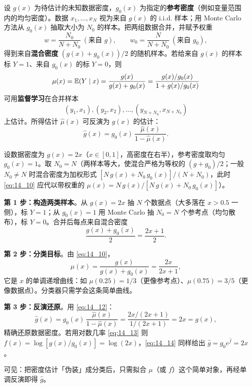 \begin{definition}[密度估计转分类]
设 $g(x)$ 为待估计的未知数据密度，$g_0(x)$ 为指定的\textbf{参考密度}（例如变量范围内的均匀密度）。数据 $x_1,\dots,x_N$ 视为来自 $g(x)$ 的 i.i.d. 样本；用 Monte Carlo 方法从 $g_0(x)$ 抽取大小为 $N_0$ 的样本。把两组数据合并，并赋予权重
\[
w = \frac{N_0}{N+N_0}\ (\text{来自 } g),\qquad w_0 = \frac{N}{N+N_0}\ (\text{来自 } g_0),
\]
得到来自\textbf{混合密度} $(g(x)+g_0(x))/2$ 的随机样本。若给来自 $g(x)$ 的样本标 $Y=1$、来自 $g_0(x)$ 的标 $Y=0$，则
\begin{equation}
\mu(x) = \mathbb{E}(Y\mid x) = \frac{g(x)}{g(x)+g_0(x)} = \frac{g(x)/g_0(x)}{1+g(x)/g_0(x)} \label{eq:14_10}
\end{equation}
可用\textbf{监督学习}在合并样本
\begin{equation}
(y_1,x_1), (y_2,x_2), \dots, (y_{N+N_0}, x_{N+N_0}) \label{eq:14_11}
\end{equation}
上估计。所得估计 $\hat\mu(x)$ 可反演为 $g(x)$ 的估计：
\begin{equation}
\hat g(x) = g_0(x)\,\frac{\hat\mu(x)}{1-\hat\mu(x)}. \label{eq:14_12}
\end{equation}
\end{definition}

\begin{example}[一维密度估计转分类的完整流程]
设数据密度为 $g(x)=2x$（$x\in[0,1]$，高密度在右半），参考密度取均匀 $g_0(x)=1$。取 $N_0=N$（两样本等大，使混合严格为等权的 $(g+g_0)/2$；一般 $N_0\neq N$ 时混合密度为加权形式 $[N\,g(x)+N_0\,g_0(x)]/(N+N_0)$，此时 \eqref{eq:14_10} 应代以带权重的 $\mu(x)=N\,g(x)/[N\,g(x)+N_0\,g_0(x)]$）。

\textbf{第 1 步：构造两类样本}。从 $g(x)=2x$ 抽 $N$ 个数据点（大多落在 $x>0.5$ 一侧），标 $Y=1$；从 $g_0(x)=1$ 用 Monte Carlo 抽 $N_0=N$ 个参考点（均匀散布），标 $Y=0$。合并后每点来自混合密度
\[
\frac{g(x)+g_0(x)}{2}=\frac{2x+1}{2}.
\]

\textbf{第 2 步：分类目标}。由 \eqref{eq:14_10}，
\[
\mu(x)=\frac{g(x)}{g(x)+g_0(x)}=\frac{2x}{2x+1},
\]
它是 $x$ 的单调递增曲线：如 $\mu(0.25)=1/3$（更像参考点）、$\mu(0.75)=3/5$（更像数据点）。分类器只需学会这条简单曲线。

\textbf{第 3 步：反演还原}。用 \eqref{eq:14_12}：
\[
\hat g(x)=g_0(x)\,\frac{\hat\mu(x)}{1-\hat\mu(x)}
=\frac{2x/(2x+1)}{1/(2x+1)}=2x=g(x),
\]
精确还原数据密度。若用对数几率 \eqref{eq:14_13} 则 $f(x)=\log[g(x)/g_0(x)]=\log(2x)$，\eqref{eq:14_14} 同样给出 $\hat g=g_0 e^{\hat f}=2x$。

可见：把密度估计「伪装」成分类后，只需拟合 $\mu$（或 $f$）这个简单对象，再经单调反演即得 $\hat g$。
\end{example}


